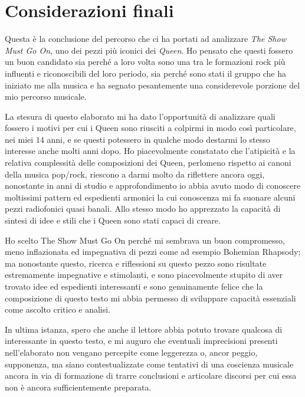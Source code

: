 \documentclass[12pt]{article}
\begin{document}
\section{Considerazioni finali}
Questa è la conclusione del percorso che ci ha portati ad analizzare \emph{The Show Must Go On}, uno dei pezzi più iconici dei \emph{Queen}. Ho pensato che questi fossero un buon candidato sia perché a loro volta sono una tra le formazioni rock più influenti e riconoscibili del loro periodo, sia perché sono stati il gruppo che ha iniziato me alla musica e ha segnato pesantemente una considerevole porzione del mio percorso musicale.

La stesura di questo elaborato mi ha dato l'opportunità di analizzare quali fossero i motivi per cui i Queen sono riusciti a colpirmi in modo così particolare, nei miei \(14\) anni, e se questi potessero in qualche modo destarmi lo stesso interesse anche molti anni dopo. Ho piacevolmente constatato che l'atipicità e la relativa complessità delle composizioni dei Queen, perlomeno rispetto ai canoni della musica pop/rock, riescono a darmi molto da riflettere ancora oggi, nonostante in anni di studio e approfondimento io abbia avuto modo di conoscere moltissimi pattern ed espedienti armonici la cui conoscenza mi fa suonare alcuni pezzi radiofonici quasi banali. Allo stesso modo ho apprezzato la capacità di sintesi di idee e stili che i Queen sono stati capaci di creare.

Ho scelto The Show Must Go On perché mi sembrava un buon compromesso, meno inflazionata ed impegnativa di pezzi come ad esempio Bohemian Rhapsody; ma nonostante questo, ricerca e riflessioni su questo pezzo sono risultate estremamente impegnative e stimolanti, e sono piacevolmente stupito di aver trovato idee ed espedienti interessanti e sono genuinamente felice che la composizione di questo testo mi abbia permesso di sviluppare capacità essenziali come ascolto critico e analisi.

In ultima istanza, spero che anche il lettore abbia potuto trovare qualcosa di interessante in questo testo, e mi auguro che eventuali imprecisioni presenti nell'elaborato non vengano percepite come leggerezza o, ancor peggio, supponenza, ma siano contestualizzate come tentativi di una coscienza musicale ancora in via di formazione di trarre conclusioni e articolare discorsi per cui essa non è ancora sufficientemente preparata.

\newpage

\appendix
\end{document}
